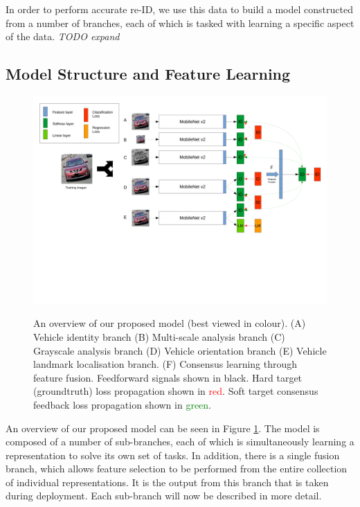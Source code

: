 \documentclass[10pt,twocolumn,letterpaper]{article}
\begin{document}
In order to perform accurate re-ID, we use this data to build a model constructed from a number of branches, each of which is tasked with learning a specific aspect of the data. \emph{TODO expand}

\subsection{Model Structure and Feature Learning}

\begin{figure}
  \includegraphics[width=\linewidth,trim=0cm 10cm 0cm 0cm,clip=true]{images/system_overview.pdf}
  \label{F:overview}
  \caption{An overview of our proposed model (best viewed in colour). (A) Vehicle identity branch (B) Multi-scale analysis branch (C) Grayscale analysis branch (D) Vehicle orientation branch (E) Vehicle landmark localisation branch. (F) Consensus learning through feature fusion. Feedforward signals shown in black. Hard target (groundtruth) loss propagation shown in \textcolor{red}{red}. Soft target consensus feedback loss propagation shown in \textcolor{green}{green}.}
\end{figure}

An overview of our proposed model can be seen in Figure \ref{F:overview}. The model is composed of a number of sub-branches, each of which is simultaneously learning a representation to solve its own set of tasks. In addition, there is a single fusion branch, which allows feature selection to be performed from the entire collection of individual representations. It is the output from this branch that is taken during deployment. Each sub-branch will now be described in more detail.
\end{document}
